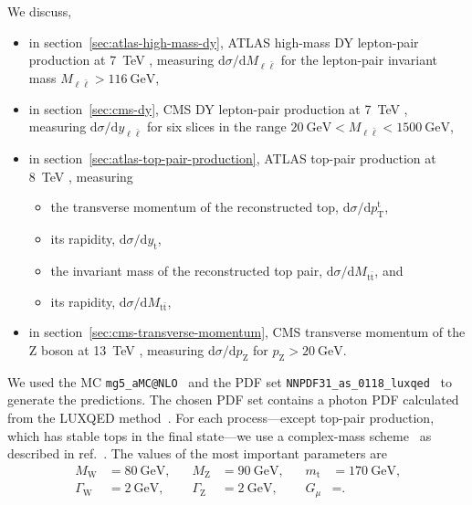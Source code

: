 We discuss,
\begin{itemize}
\item in section~\ref{sec:atlas-high-mass-dy}, ATLAS high-mass DY lepton-pair production at \SI{7}{\tera\electronvolt} \cite{Aad:2013iua}, measuring $\mathrm{d} \sigma / \mathrm{d} M_{\ell \bar{\ell}}$ for the lepton-pair invariant mass $M_{\ell \bar{\ell}} > \SI{116}{\giga\electronvolt}$,
\item in section~\ref{sec:cms-dy}, CMS DY lepton-pair production at \SI{7}{\tera\electronvolt} \cite{Chatrchyan:2013tia}, measuring $\mathrm{d} \sigma / \mathrm{d} y_{\ell \bar{\ell}}$ for six slices in the range $\SI{20}{\giga\electronvolt} < M_{\ell \bar{\ell}} < \SI{1500}{\giga\electronvolt}$,
\item in section~\ref{sec:atlas-top-pair-production}, ATLAS top-pair production at \SI{8}{\tera\electronvolt} \cite{Aad:2015mbv}, measuring
\begin{itemize}
\item the transverse momentum of the reconstructed top, $\mathrm{d} \sigma / \mathrm{d} p_\mathrm{T}^\mathrm{t}$,
\item its rapidity, $\mathrm{d} \sigma / \mathrm{d} y_\mathrm{t}$,
\item the invariant mass of the reconstructed top pair, $\mathrm{d} \sigma / \mathrm{d} M_{\mathrm{t} \bar{\mathrm{t}}}$, and
\item its rapidity, $\mathrm{d} \sigma / \mathrm{d} M_{\mathrm{t} \bar{\mathrm{t}}}$,
\end{itemize}
\item in section~\ref{sec:cms-transverse-momentum}, CMS transverse momentum of the Z boson at \SI{13}{\tera\electronvolt} \cite{Sirunyan:2019bzr}, measuring $\mathrm{d} \sigma / \mathrm{d} p_\mathrm{Z}$ for $p_\mathrm{Z} > \SI{20}{\giga\electronvolt}$.
\end{itemize}
We used the MC \texttt{mg5\_aMC@NLO}~\cite{} and the PDF set \texttt{NNPDF31\_as\_0118\_luxqed}~\cite{} to generate the predictions.
The chosen PDF set contains a photon PDF calculated from the LUXQED method~\cite{}.
For each process---except top-pair production, which has stable tops in the final state---we use a complex-mass scheme~\cite{} as described in ref.~\cite{}.
The values of the most important parameters are
\begin{equation}
\begin{aligned}
M_\mathrm{W} &= \SI{80}{\giga\electronvolt} \text{,} \quad &
M_\mathrm{Z} &= \SI{90}{\giga\electronvolt} \text{,} \quad &
m_\mathrm{t} &= \SI{170}{\giga\electronvolt} \text{,} \\
\Gamma_\mathrm{W} &= \SI{2}{\giga\electronvolt} \text{,} &
\Gamma_\mathrm{Z} &= \SI{2}{\giga\electronvolt} \text{,} &
G_\mu &= \text{.}
\end{aligned}
\end{equation}

